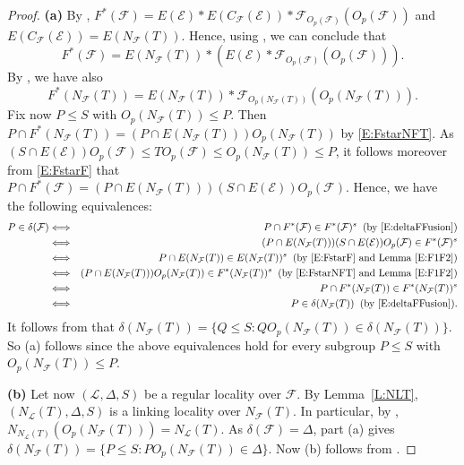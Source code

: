 \documentclass[reqno,11pt]{amsart}
\numberwithin{equation}{section}
\theoremstyle{definition}
\newcommand{\F}{\mathcal{F}}
\newcommand{\E}{\mathcal{E}}
\renewcommand{\L}{\mathcal{L}}
\begin{document}
\begin{proof}
\textbf{(a)} By \cite[Lemma~7.13(c), Corollary~7.18]{Chermak/Henke}, $F^*(\F)=E(\E)*E(C_\F(\E))*\F_{O_p(\F)}(O_p(\F))$ and $E(C_\F(\E))=E(N_\F(T))$. Hence, using \cite[Lemma~2.16(c)]{Chermak/Henke}, we can conclude that
\begin{equation}\label{E:FstarF}
F^*(\F)=E(N_\F(T))*(E(\E)*\F_{O_p(\F)}(O_p(\F))).
\end{equation}
By \cite[Theorem~7.10(e)]{Chermak/Henke}, we have also
\begin{equation}\label{E:FstarNFT}
 F^*(N_\F(T))=E(N_\F(T))*\F_{O_p(N_\F(T))}(O_p(N_\F(T))).
\end{equation}
Fix now $P\leq S$ with $O_p(N_\F(T))\leq P$.  Then $P\cap F^*(N_\F(T))=(P\cap E(N_\F(T)))O_p(N_\F(T))$ by \eqref{E:FstarNFT}. As $(S\cap E(\E))O_p(\F)\leq TO_p(\F)\leq O_p(N_\F(T))\leq P$, it follows moreover from \eqref{E:FstarF} that $P\cap F^*(\F)=(P\cap E(N_\F(T)))(S\cap E(\E))O_p(\F)$. Hence, we have the following equivalences:
\begin{eqnarray*}
 P\in\delta(\F) &\Longleftrightarrow & P\cap F^*(\F)\in F^*(\F)^s\;\;\mbox{(by \eqref{E:deltaFFusion})}\\
&\Longleftrightarrow & (P\cap E(N_\F(T)))(S\cap E(\E))O_p(\F)\in F^*(\F)^s\\
&\Longleftrightarrow & P\cap E(N_\F(T))\in E(N_\F(T))^s\;\;\mbox{(by \eqref{E:FstarF} and Lemma~\ref{E:F1F2})}\\
&\Longleftrightarrow & (P\cap E(N_\F(T)))O_p(N_\F(T))\in F^*(N_\F(T))^s\;\;\mbox{(by \eqref{E:FstarNFT} and Lemma~\ref{E:F1F2})}\\
&\Longleftrightarrow & P\cap F^*(N_\F(T))\in F^*(N_\F(T))^s\\
&\Longleftrightarrow & P\in \delta(N_\F(T))\;\;\mbox{(by \eqref{E:deltaFFusion})}.
\end{eqnarray*}
It follows from \cite[Lemma~10.6]{Henke:Regular} that $\delta(N_\F(T))=\{Q\leq S\colon QO_p(N_\F(T))\in\delta(N_\F(T))\}$. So (a) follows since the above equivalences hold for every subgroup $P\leq S$ with $O_p(N_\F(T))\leq P$.

\smallskip

\textbf{(b)} Let now $(\L,\Delta,S)$ be a regular locality over $\F$. By Lemma~\ref{L:NLT}, $(N_\L(T),\Delta,S)$ is a linking locality over $N_\F(T)$. In particular, by \cite[Proposition~5]{Henke:2015}, $N_{N_\L(T)}(O_p(N_\F(T)))=N_\L(T)$. As $\delta(\F)=\Delta$, part (a) gives $\delta(N_\F(T))=\{P\leq S\colon PO_p(N_\F(T))\in\Delta\}$. Now (b) follows from \cite[Lemma~3.28]{Chermak/Henke}.
\end{proof}
\end{document}
